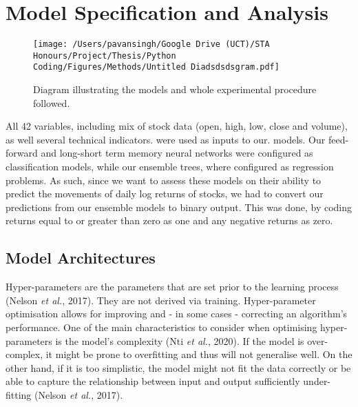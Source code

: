 
\chapter{Model Specification and Analysis} %

\label{Chapter5} %



\begin{figure}[h]
\centering
  \texttt{[image: /Users/pavansingh/Google Drive (UCT)/STA Honours/Project/Thesis/Python Coding/Figures/Methods/Untitled Diadsdsdsgram.pdf]}
  \caption{Diagram illustrating the models and whole experimental procedure followed.}
  \label{}
\end{figure}

All 42 variables, including mix of stock data (open, high, low, close and volume), as well several technical indicators. were used as inputs to our. models. Our feed-forward and long-short term memory neural networks were configured as classification models, while our ensemble trees, where configured as regression problems. As such, since we want to assess these models on their ability to predict the movements of daily log returns of stocks, we had to convert our predictions from our ensemble models to binary output. This was done, by coding returns equal to or greater than zero as one and any negative returns as zero.


\section{Model Architectures}

Hyper-parameters are the parameters that are set prior to the learning process (Nelson \textit{et al.}, 2017). They are not derived via training. Hyper-parameter optimisation allows for improving and - in some cases - correcting an algorithm’s performance. One of the main characteristics to consider when optimising hyper-parameters is the model's complexity (Nti \textit{et al.}, 2020). If the model is over-complex, it might be prone to overfitting and thus will not generalise well. On the other hand, if it is too simplistic, the model might not fit the data correctly or be able to capture the relationship between input and output sufficiently under-fitting (Nelson \textit{et al.}, 2017).

